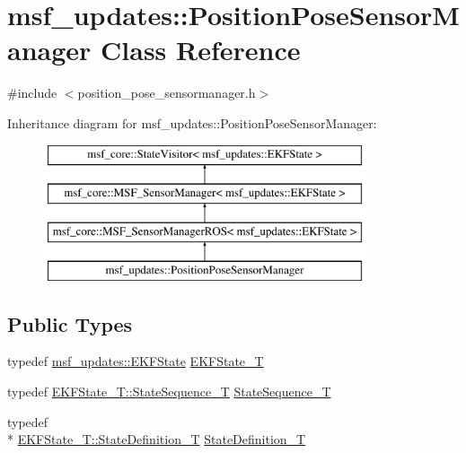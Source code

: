 \hypertarget{classmsf__updates_1_1PositionPoseSensorManager}{\section{msf\-\_\-updates\-:\-:Position\-Pose\-Sensor\-Manager Class Reference}
\label{classmsf__updates_1_1PositionPoseSensorManager}
}


{\ttfamily \#include $<$position\-\_\-pose\-\_\-sensormanager.\-h$>$}

Inheritance diagram for msf\-\_\-updates\-:\-:Position\-Pose\-Sensor\-Manager\-:\begin{figure}[H]
\begin{center}
\leavevmode
\includegraphics[height=4.000000cm]{classmsf__updates_1_1PositionPoseSensorManager}
\end{center}
\end{figure}
\subsection*{Public Types}
\begin{DoxyCompactItemize}
\item 
typedef \hyperlink{namespacemsf__updates_a03b0801c76b7400623b00ad4d28f9bcc}{msf\-\_\-updates\-::\-E\-K\-F\-State} \hyperlink{classmsf__updates_1_1PositionPoseSensorManager_a13f0de4e5765110e86b20b77ffb5397c}{E\-K\-F\-State\-\_\-\-T}
\item 
typedef \hyperlink{structmsf__core_1_1GenericState__T_a75fe70f7c7517dbf7d4c91b75b08a1dd}{E\-K\-F\-State\-\_\-\-T\-::\-State\-Sequence\-\_\-\-T} \hyperlink{classmsf__updates_1_1PositionPoseSensorManager_a84f0a9dd28bfc8286babbb15d3268f9a}{State\-Sequence\-\_\-\-T}
\item 
typedef \\*
\hyperlink{structmsf__core_1_1GenericState__T_a9a7d65b0325658ab07b81960a3ed4604}{E\-K\-F\-State\-\_\-\-T\-::\-State\-Definition\-\_\-\-T} \hyperlink{classmsf__updates_1_1PositionPoseSensorManager_a200dd7556da42317e6c812e43801779d}{State\-Definition\-\_\-\-T}
\end{DoxyCompactItemize}
